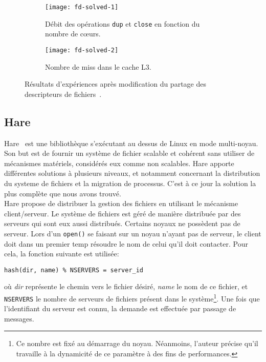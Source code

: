       \begin{figure}[ht]
        \begin{subfigure}[b]{0.5\textwidth}
          \texttt{[image: fd-solved-1]}
          \caption{Débit des opérations \texttt{dup} et \texttt{close} en
            fonction du nombre de c\oe urs.}
          \label{fig:fd-solved-1}
        \end{subfigure}
        \begin{subfigure}[b]{0.5\textwidth}
          \texttt{[image: fd-solved-2]}
          \caption{Nombre de miss dans le cache L3.}
          \label{fig:fd-solved-2}
        \end{subfigure}
        \caption{Résultats d'expériences après modification du partage des
          descripteurs de fichiers~\citep{boyd2008corey}.}
      \end{figure}
      \FloatBarrier


    \subsection{Hare}

      Hare~\citep{gruenwald2014providing} est une bibliothèque s'exécutant au
      dessus de Linux en mode multi-noyau. Son but est de fournir un système de
      fichier scalable et cohérent sans utiliser de mécanismes matériels,
      considérés eux comme non scalables. Hare apporte différentes solutions à
      plusieurs niveaux, et notamment concernant la distribution du systeme de
      fichiers et la migration de processus. C'est à ce jour la solution la plus
      complète que nous avons trouvé.\\

      Hare propose de distribuer la gestion des fichiers en utilisant le
      mécanisme client/serveur. Le système de fichiers est géré de manière
      distribuée par des serveurs qui sont eux aussi distribués. Certains noyaux
      ne possèdent pas de serveur. Lors d'un \texttt{open()} se faisant sur un
      noyau n'ayant pas de serveur, le client doit dans un premier temp résoudre
      le nom de celui qu'il doit contacter. Pour cela, la fonction suivante est
      utilisée:
      \begin{center}
        \texttt{hash(dir, name) \% NSERVERS = server\_id}
      \end{center}
      où \textit{dir} représente le chemin vers le fichier désiré, \textit{name}
      le nom de ce fichier, et \texttt{NSERVERS} le nombre de serveurs de
      fichiers présent dans le système\footnote{Ce nombre est fixé au démarrage
        du noyau. Néanmoins, l'auteur précise qu'il travaille à la dynamicité de
        ce paramètre à des fins de performances.}. Une fois que l'identifiant du
      serveur est connu, la demande est effectuée par passage de messages.

